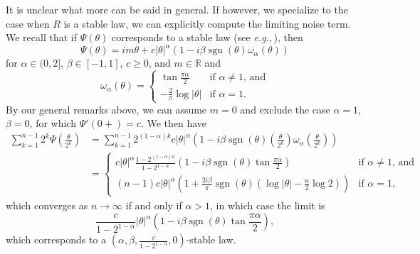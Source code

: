 \documentclass{article}
\newcommand{\eg}{\textit{e.g.,}\,}
\newcommand{\1}{\mathbbm{1}}
\DeclareMathOperator*{\sgn}{sgn}
\theoremstyle{remark}
\theoremstyle{definition}
\begin{document}
It is unclear what more can be said in general. If however, we specialize to the case when $R$ is a stable law, we can explicitly compute the limiting noise term.  We recall that if $\Psi(\theta)$ corresponds to a stable law (see \eg \cite{breiman1992probability}), then
\[
	\Psi(\theta) = im\theta + c|\theta|^{\alpha} (1-i\beta \sgn(\theta)\omega_{\alpha}(\theta))
\]
for $\alpha \in (0,2]$, $\beta \in [-1,1]$, $c \geq 0$, and $m \in \mathbb{R}$ and
\[
	\omega_{\alpha}(\theta) = \begin{cases}
		\tan{\frac{\pi\alpha}{2}} & \text{if $\alpha \neq 1$, and}\\
		-\frac{2}{\pi}\log{|\theta|} & \text{if $\alpha = 1$.}
	\end{cases}
\]
By our general remarks above, we can assume $m = 0$ and exclude the case $\alpha = 1$, $\beta = 0$, for which  $\Psi'(0+) = c$. We then have
\begin{align*}
	 \sum_{k=1}^{n-1}  {\textstyle 2^{k} \Psi\left(\frac{\theta}{2^{k}}\right)}
	 &=  \sum_{k=1}^{n-1} 2^{(1-\alpha)k} c|\theta|^{\alpha} {\textstyle\left(1-i \beta\sgn(\theta)\left(\frac{\theta}{2^{k}}\right)
	 	 \omega_{\alpha}\left(\frac{\theta}{2^{k}}\right)\right)}\\
	&= \begin{cases}
		 c|\theta|^{\alpha}\frac{1-2^{(1-\alpha)n}}{1-2^{1-\alpha}}\left(1-i\beta \sgn(\theta) \tan{\frac{\pi\alpha}{2}}\right) & \text{if $\alpha \neq 1$, and}\\	
         (n-1) c|\theta|^{\alpha}  \left(1+\frac{2i\beta}{\pi}\sgn(\theta)\left(\log{|\theta|} - \frac{n}{2} \log{2}\right)\right) & \text{if $\alpha = 1$,}
	\end{cases}
\end{align*}
which converges as $n \to \infty$ if and only if $\alpha > 1$, in which case the limit is 
\begin{equation}\label{eq:stablenoises}
	 \frac{c}{1-2^{1-\alpha}}|\theta|^{\alpha}\left(1-i\beta \sgn(\theta) \tan{\frac{\pi\alpha}{2}}\right), 
\end{equation}
which corresponds to a $\left(\alpha,\beta, \frac{c}{1-2^{1-\alpha}},0\right)$-stable law.
\end{document}

